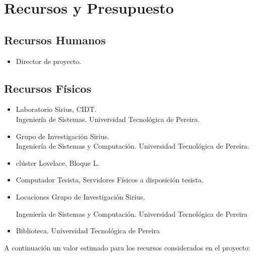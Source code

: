 \documentclass[letterpaper, 12pt, oneside]{article}
\begin{document}
    \section{Recursos y Presupuesto}
    \subsection{Recursos Humanos}
    \begin{itemize}
        \item Director de proyecto.
    \end{itemize}
    
    \subsection{Recursos Físicos}
    \begin{itemize}
	    \item Laboratorio Sirius, CIDT. \\
	    Ingeniería de Sistemas. Universidad Tecnológica de Pereira. 
        \item Grupo de Investigación Sirius. \\
        Ingeniería de Sistemas y Computación. Universidad Tecnológica de Pereira.
        \item clúster Lovelace, Bloque L.
        \item Computador Tesista, Servidores Físicos a disposición tesista.
        \item Locaciones Grupo de Investigación Sirius. \par Ingeniería de Sistemas y Computación. Universidad Tecnológica de Pereira
        \item Biblioteca. Universidad Tecnológica de Pereira
	\end{itemize}
	
	A continuación un valor estimado para los recursos considerados en el proyecto:
	\begin{table}[h]
    \centering
    \begin{tabular}{}
    \end{tabular}
    \caption{}
    \label{tab:label}
    \end{table}
\end{document}
